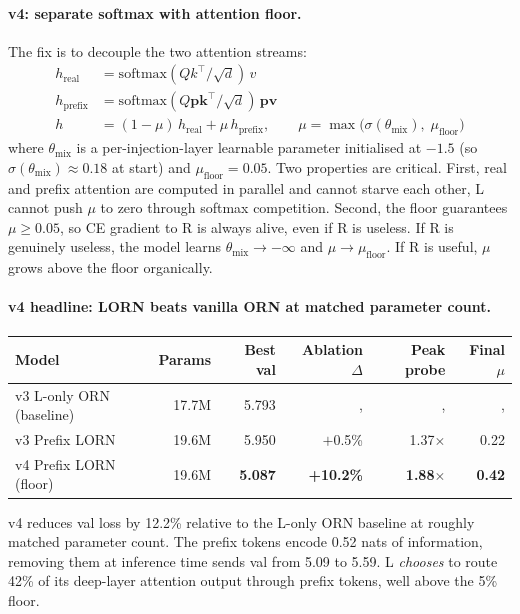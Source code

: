\documentclass[11pt, a4paper]{article}
\theoremstyle{plain}
\theoremstyle{definition}
\theoremstyle{remark}
\begin{document}
\paragraph{v4: separate softmax with attention floor.}
The fix is to decouple the two attention streams:
\begin{align}
h_{\text{real}} &= \mathrm{softmax}(Qk^\top/\sqrt d)\,v \\
h_{\text{prefix}} &= \mathrm{softmax}(Q\mathbf{pk}^\top/\sqrt d)\,\mathbf{pv} \\
h &= (1-\mu)\,h_{\text{real}} + \mu\,h_{\text{prefix}},\qquad \mu = \max\!\big(\sigma(\theta_{\text{mix}}),\; \mu_{\text{floor}}\big)
\end{align}
where $\theta_{\text{mix}}$ is a per-injection-layer learnable parameter initialised at $-1.5$ (so $\sigma(\theta_{\text{mix}}) \approx 0.18$ at start) and $\mu_{\text{floor}} = 0.05$.
Two properties are critical.
First, real and prefix attention are computed in parallel and cannot starve each other, L cannot push $\mu$ to zero through softmax competition.
Second, the floor guarantees $\mu \geq 0.05$, so CE gradient to R is always alive, even if R is useless.
If R is genuinely useless, the model learns $\theta_{\text{mix}} \to -\infty$ and $\mu \to \mu_{\text{floor}}$.
If R is useful, $\mu$ grows above the floor organically.

\paragraph{v4 headline: LORN beats vanilla ORN at matched parameter count.}
\begin{center}
\begin{tabular}{lrrrrr}
\toprule
Model & Params & Best val & Ablation $\Delta$ & Peak probe & Final $\mu$ \\
\midrule
v3 L-only ORN (baseline) & 17.7M & 5.793 & ,  & ,  & ,  \\
v3 Prefix LORN           & 19.6M & 5.950 & $+$0.5\% & 1.37$\times$ & 0.22 \\
v4 Prefix LORN (floor)   & 19.6M & \textbf{5.087} & \textbf{+10.2\%} & \textbf{1.88}$\times$ & \textbf{0.42} \\
\bottomrule
\end{tabular}
\end{center}
v4 reduces val loss by 12.2\% relative to the L-only ORN baseline at roughly matched parameter count.
The prefix tokens encode 0.52 nats of information, removing them at inference time sends val from 5.09 to 5.59.
L \emph{chooses} to route 42\% of its deep-layer attention output through prefix tokens, well above the 5\% floor.
\end{document}

